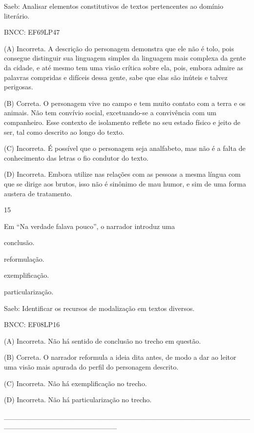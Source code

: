 Saeb: Analisar elementos constitutivos de textos pertencentes ao domínio
literário.

BNCC: EF69LP47

(A) Incorreta. A descrição do personagem demonstra que ele não é tolo,
pois consegue distinguir sua linguagem simples da linguagem mais
complexa da gente da cidade, e até mesmo tem uma visão crítica sobre
ela, pois, embora admire as palavras compridas e difíceis dessa gente,
sabe que elas são inúteis e talvez perigosas.

(B) Correta. O personagem vive no campo e tem muito contato com a terra
e os animais. Não tem convívio social, excetuando-se a convivência com
um companheiro. Esse contexto de isolamento reflete no seu estado físico
e jeito de ser, tal como descrito ao longo do texto.

(C) Incorreta. É possível que o personagem seja analfabeto, mas não é a
falta de conhecimento das letras o fio condutor do texto.

(D) Incorreta. Embora utilize nas relações com as pessoas a mesma língua
com que se dirige aos brutos, isso não é sinônimo de mau humor, e sim de
uma forma austera de tratamento.

\num{15}

Em ``Na verdade falava pouco'', o narrador introduz uma

\begin{escolha}
\item conclusão.

\item reformulação.

\item exemplificação.

\item particularização.
\end{escolha}

Saeb: Identificar os recursos de modalização em textos diversos.

BNCC: EF08LP16

(A) Incorreta. Não há sentido de conclusão no trecho em questão.

(B) Correta. O narrador reformula a ideia dita antes, de modo a dar ao
leitor uma visão mais apurada do perfil do personagem descrito.

(C) Incorreta. Não há exemplificação no trecho.

(D) Incorreta. Não há particularização no trecho.

\_\_\_\_\_\_\_\_\_\_\_\_\_\_\_\_\_\_\_\_\_\_\_\_\_\_\_\_\_\_\_\_\_\_\_\_\_\_\_\_\_\_\_\_\_\_\_\_\_\_\_\_\_\_\_\_\_\_\_\_\_\_\_\_\_\_\_\_\_\_

